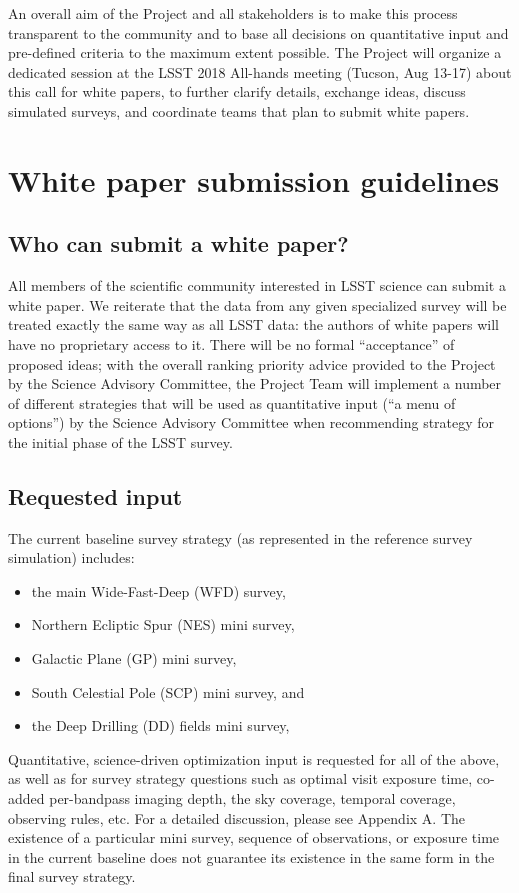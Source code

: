 \documentclass[DM,lsstdraft,toc,usenatbib]{lsstdoc}
\begin{document}
An overall aim of the Project and all stakeholders is to make this process transparent to the community and to base 
all decisions on quantitative input and pre-defined criteria to the maximum extent possible. 
The Project will organize a dedicated session at the LSST 2018 All-hands meeting (Tucson, Aug 13-17)
about this call for white papers, to further clarify  details, exchange ideas, discuss simulated surveys, 
and coordinate teams that plan to submit white papers. 


\section{White paper submission guidelines} 


\subsection{Who can submit a white paper?} 

All members of the scientific community interested in LSST science can submit a white paper. 
We reiterate that the data from any given specialized survey will be treated exactly the same 
way as all LSST data: the authors of white papers will have no proprietary access to it. There will be no 
formal ``acceptance'' of proposed ideas; with the overall ranking priority advice provided to the 
Project by the Science Advisory Committee, the Project Team will implement a number of
different strategies that will be used as quantitative input (``a menu of options'') by the 
Science Advisory Committee when recommending strategy for the initial phase of the LSST survey. 


\subsection{Requested input \label{sec:reqinput}}

The current baseline survey strategy (as represented in the reference survey simulation) includes:
\begin{itemize}
\item the main Wide-Fast-Deep (WFD) survey,
\item Northern Ecliptic Spur (NES) mini survey, 
\item Galactic Plane (GP) mini survey,
\item South Celestial Pole (SCP) mini survey, and
\item the Deep Drilling (DD) fields mini survey,
\end{itemize}
Quantitative, science-driven optimization input is requested for all of the above, as well as 
for survey strategy questions such as optimal visit exposure time,
co-added per-bandpass imaging depth, the sky coverage, temporal coverage, observing
rules, etc.  For a detailed discussion, please see Appendix A. The existence of a particular
mini survey, sequence of observations, or exposure time in the current baseline does not 
guarantee its existence in the same form in the final survey strategy. 
\end{document}
